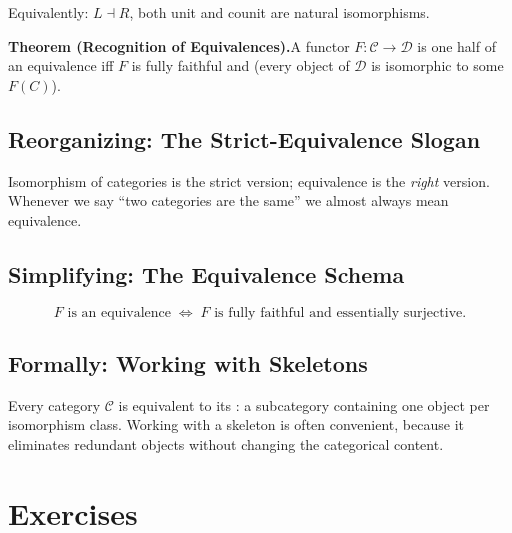Equivalently: $L \dashv R$, both unit and counit are natural isomorphisms.

\textbf{Theorem (Recognition of Equivalences).}\quad A functor
$F : \mathcal{C} \to \mathcal{D}$ is one half of an equivalence iff $F$
is fully faithful and  (every object of
$\mathcal{D}$ is isomorphic to some $F(C)$).

\subsection{Reorganizing: The Strict-Equivalence Slogan}

Isomorphism of categories is the strict version; equivalence is the
\emph{right} version. Whenever we say ``two categories are the same'' we
almost always mean equivalence.

\subsection{Simplifying: The Equivalence Schema}

\begin{equation*}
  F \text{ is an equivalence}
  \;\iff\;
  F \text{ is fully faithful and essentially surjective}.
\end{equation*}

\subsection{Formally: Working with Skeletons}

Every category $\mathcal{C}$ is equivalent to its : a
subcategory containing one object per isomorphism class. Working with a
skeleton is often convenient, because it eliminates redundant objects
without changing the categorical content.


\section*{Exercises}

